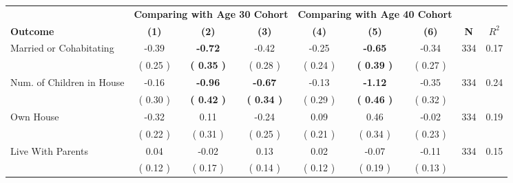 \begin{tabular}{lcccccccc}
\toprule
 & \multicolumn{3}{c}{\textbf{Comparing with Age 30 Cohort}} & \multicolumn{3}{c}{\textbf{Comparing with Age 40 Cohort}} & \\
\cmidrule(lr){2-4} \cmidrule(lr){5-7} 
 \textbf{Outcome} & \textbf{(1)} & \textbf{(2)} & \textbf{(3)} & \textbf{(4)} & \textbf{(5)} & \textbf{(6)} & \textbf{N} & \textbf{$ R^2$} \\
\midrule
Married or Cohabitating &     -0.39 & \textbf{    -0.72} &     -0.42 &     -0.25 & \textbf{    -0.65} &     -0.34 & 334 &       0.17 \\ 
 & (     0.25 ) & \textbf{(     0.35 )} & (     0.28 ) & (     0.24 ) & \textbf{(     0.39 )} & (     0.27 ) & \\
Num. of Children in House &     -0.16 & \textbf{    -0.96} & \textbf{    -0.67} &     -0.13 & \textbf{    -1.12} &     -0.35 & 334 &       0.24 \\ 
 & (     0.30 ) & \textbf{(     0.42 )} & \textbf{(     0.34 )} & (     0.29 ) & \textbf{(     0.46 )} & (     0.32 ) & \\
Own House &     -0.32 &      0.11 &     -0.24 &      0.09 &      0.46 &     -0.02 & 334 &       0.19 \\ 
 & (     0.22 ) & (     0.31 ) & (     0.25 ) & (     0.21 ) & (     0.34 ) & (     0.23 ) & \\
Live With Parents &      0.04 &     -0.02 &      0.13 &      0.02 &     -0.07 &     -0.11 & 334 &       0.15 \\ 
 & (     0.12 ) & (     0.17 ) & (     0.14 ) & (     0.12 ) & (     0.19 ) & (     0.13 ) & \\
\bottomrule
\end{tabular}
